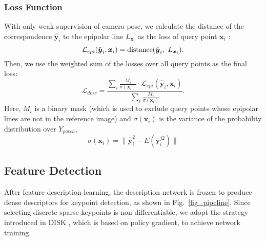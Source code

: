 \documentclass[10pt,twocolumn,letterpaper]{article}
\begin{document}
\subsubsection{Loss Function}
\label{sec_loss}
With only weak supervision of camera pose, we calculate the distance of the correspondence $\hat{\boldsymbol{y}}_i$ to the epipolar line $L_{\boldsymbol{x}_i}$ as the loss of query point $\boldsymbol{x}_i$   \cite{wangLearningFeatureDescriptors2020}:
\begin{equation}
    \label{eq_epiloss}
    \mathcal{L}_{epi}( {\hat{\boldsymbol{y}}_i},  \boldsymbol{x}_i)={\rm distance}({\hat{\boldsymbol{y}}_i},~{L_{\boldsymbol{x}_i}}).
\end{equation}
Then, we use the weighted sum of the losses over all query points as the final loss:
\begin{equation}
    \mathcal{L}_{desc}= \frac{\sum_{i} \frac{M_i}{ {\sigma}( \boldsymbol{x}_i)} \cdot\mathcal{L}_{epi}( \hat{ \boldsymbol{y}}_{i},  {\boldsymbol{x}_i})}{\sum_i \frac{M_i}{ {\sigma}( \boldsymbol{x}_i)}}.
\end{equation}
Here, $M_i$ is a binary mask (which is used to exclude query points whose epipolar lines are not in the reference image) and  $ {\sigma}( \boldsymbol{x}_i)$ is the variance of the probability distribution over $Y_{patch}$,
\begin{equation}
    {\sigma}( \boldsymbol{x}_i)=\lVert \hat{\boldsymbol{y}}_i^2 - E({\boldsymbol{y}_i^{j 2}}) \rVert
\end{equation}


\subsection{Feature Detection}
\label{text_method_dete}
After feature description learning, the description network is frozen to produce dense descriptors for keypoint detection, as shown in Fig.~\ref{fig_pipeline}. 
Since selecting discrete sparse keypoints is non-differentiable, we adopt the strategy introduced in DISK \cite{tyszkiewiczDISKLearningLocal2020a}, which is  based on policy gradient, to achieve network training.
\end{document}
